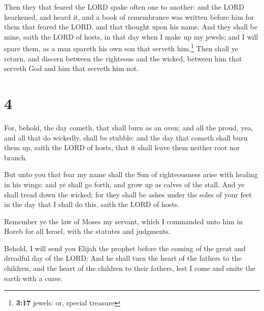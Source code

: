  Then they that feared the LORD spake often one to
another: and the LORD hearkened, and heard it, and a book of remembrance
was written before him for them that feared the LORD, and that thought
upon his name.  And they shall be mine, saith the LORD of
hosts, in that day when I make up my jewels; and I will spare them, as a
man spareth his own son that serveth him.\footnote{\textbf{3:17} jewels:
  or, special treasure}  Then shall ye return, and
discern between the righteous and the wicked, between him that serveth
God and him that serveth him not.

\hypertarget{section-3}{%
\section{4}\label{section-3}}

 For, behold, the day cometh, that shall burn as an oven;
and all the proud, yea, and all that do wickedly, shall be stubble: and
the day that cometh shall burn them up, saith the LORD of hosts, that it
shall leave them neither root nor branch.

 But unto you that fear my name shall the Sun of
righteousness arise with healing in his wings; and ye shall go forth,
and grow up as calves of the stall.  And ye shall tread
down the wicked; for they shall be ashes under the soles of your feet in
the day that I shall do this, saith the LORD of hosts.

 Remember ye the law of Moses my servant, which I
commanded unto him in Horeb for all Israel, with the statutes and
judgments.

 Behold, I will send you Elijah the prophet before the
coming of the great and dreadful day of the LORD:  And he
shall turn the heart of the fathers to the children, and the heart of
the children to their fathers, lest I come and smite the earth with a
curse.
